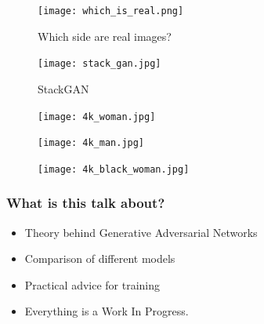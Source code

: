 \documentclass{Bredelebeamer}
\begin{document}
\begin{frame}
\begin{figure}[h!]
	\centering
	\texttt{[image: which\_is\_real.png]}
	\caption{Which side are real images?}
	\label{fig:which_is_real}
\end{figure}
\end{frame}


\begin{frame}
\begin{figure}[h!]
	\centering
	\texttt{[image: stack\_gan.jpg]}
	\caption{StackGAN}
\end{figure}
\end{frame}

\begin{frame}
\begin{figure}[h!]
	\centering
	\texttt{[image: 4k\_woman.jpg]}
\end{figure}
\end{frame}

\begin{frame}
\begin{figure}[h!]
	\centering
	\texttt{[image: 4k\_man.jpg]}
\end{figure}
\end{frame}

\begin{frame}
\begin{figure}[h!]
	\centering
	\texttt{[image: 4k\_black\_woman.jpg]}
\end{figure}
\end{frame}

\begin{frame}[c]{ }
\centering
\href{https://www.youtube.com/watch?v=XOxxPcy5Gr4}{}
\end{frame}

\begin{frame}
\frametitle{What is this talk about?}
\begin{itemize}
	\item Theory behind Generative Adversarial Networks
	\item Comparison of different models
	\item Practical advice for training
	\item Everything is a Work In Progress.
\end{itemize}

\end{frame}
\end{document}
